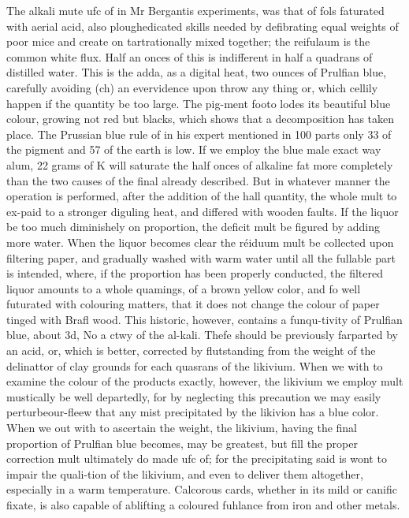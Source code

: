 The alkali mute ufc of in Mr Bergantis experiments, was that of fols faturated with aerial acid, also ploughedicated skills needed by defibrating equal weights of poor mice and create on tartrationally mixed together; the reifulaum is the common white flux. Half an onces of this is indifferent in half a quadrans of distilled water. This is the adda, as a digital heat, two ounces of Prulfian blue, carefully avoiding (ch) an evervidence upon throw any thing or, which cellily happen if the quantity be too large. The pig-ment footo lodes its beautiful blue colour, growing not red but blacks, which shows that a decomposition has taken place. The Prussian blue rule of in his expert mentioned in 100 parts only 33 of the pigment and 57 of the earth is low. If we employ the blue male exact way alum, 22 grams of K will saturate the half onces of alkaline fat more completely than the two causes of the final already described. But in whatever manner the operation is performed, after the addition of the hall quantity, the whole mult to ex-paid to a stronger diguling heat, and differed with wooden faults. If the liquor be too much diminishely on proportion, the deficit mult be figured by adding more water. When the liquor becomes clear the réiduum mult be collected upon filtering paper, and gradually washed with warm water until all the fullable part is intended, where, if the proportion has been properly conducted, the filtered liquor amounts to a whole quamings, of a brown yellow color, and fo well futurated with colouring matters, that it does not change the colour of paper tinged with Brafl wood. This historic, however, contains a funqu-tivity of Prulfian blue, about 3d, No a ctwy of the al-kali. Thefe should be previously farparted by an acid, or, which is better, corrected by flutstanding from the weight of the delinattor of clay grounds for each quasrans of the likivium. When we with to examine the colour of the products exactly, however, the likivium we employ mult mustically be well departedly, for by neglecting this precaution we may easily perturbeour-fleew that any mist precipitated by the likivion has a blue color. When we out with to ascertain the weight, the likivium, having the final proportion of Prulfian blue becomes, may be greatest, but fill the proper correction mult ultimately do made ufc of; for the precipitating said is wont to impair the quali-tion of the likivium, and even to deliver them altogether, especially in a warm temperature. Calcorous cards, whether in its mild or canific fixate, is also capable of ablifting a coloured fuhlance from iron and other metals.\par\medskip
